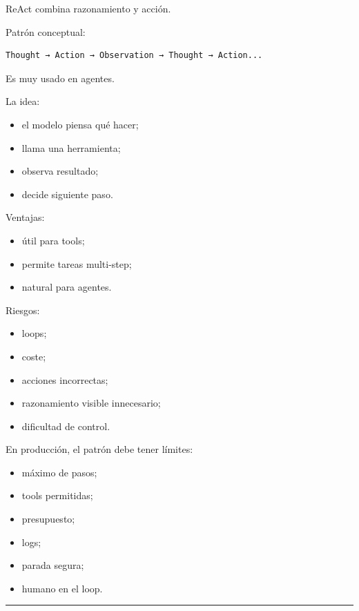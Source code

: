 ReAct combina razonamiento y acción.

Patrón conceptual:

\begin{lstlisting}
Thought → Action → Observation → Thought → Action...
\end{lstlisting}

Es muy usado en agentes.

La idea:

\begin{itemize}
\tightlist
\item
  el modelo piensa qué hacer;
\item
  llama una herramienta;
\item
  observa resultado;
\item
  decide siguiente paso.
\end{itemize}

Ventajas:

\begin{itemize}
\tightlist
\item
  útil para tools;
\item
  permite tareas multi-step;
\item
  natural para agentes.
\end{itemize}

Riesgos:

\begin{itemize}
\tightlist
\item
  loops;
\item
  coste;
\item
  acciones incorrectas;
\item
  razonamiento visible innecesario;
\item
  dificultad de control.
\end{itemize}

En producción, el patrón debe tener límites:

\begin{itemize}
\tightlist
\item
  máximo de pasos;
\item
  tools permitidas;
\item
  presupuesto;
\item
  logs;
\item
  parada segura;
\item
  humano en el loop.
\end{itemize}

\begin{center}\rule{0.5\linewidth}{0.5pt}\end{center}

